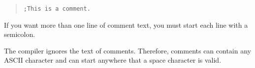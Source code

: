 \begin{quote}
\begin{verbatim}
;This is a comment.
\end{verbatim}
\end{quote}

If you want more than one line of comment text, you must start each
line with a semicolon.

The compiler ignores the text of comments.  Therefore, comments can
contain any ASCII character and can start anywhere that a space
character is valid.

